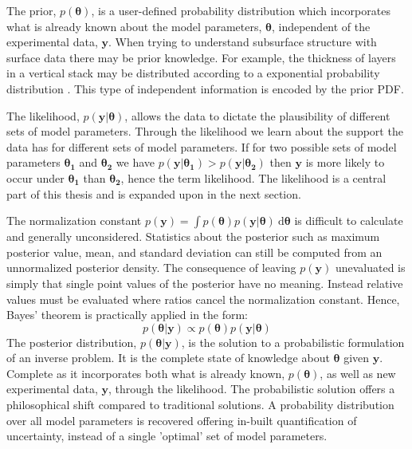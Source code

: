 The prior, $p(\bm{\theta})$, is a user-defined probability distribution which incorporates what is already known about the model parameters, $\bm{\theta}$, independent of the experimental data, $\bm{y}$. When trying to understand subsurface structure with surface data there may be prior knowledge. For example, the thickness of layers in a vertical stack may be distributed according to a exponential probability distribution \citep{Mosegaard1995}. This type of independent information is encoded by the prior PDF.\par

The likelihood, $p(\bm{y}|\bm{\theta})$, allows the data to dictate the plausibility of different sets of model parameters. Through the likelihood we learn about the support the data has for different sets of model parameters. If for two possible sets of model parameters $\bm{\theta_1}$ and $\bm{\theta_2}$ we have $p(\bm{y}|\bm{\theta_1}) > p(\bm{y}|\bm{\theta_2})$ then $\bm{y}$ is more likely to occur under $\bm{\theta_1}$ than $\bm{\theta_2}$, hence the term likelihood. The likelihood is a central part of this thesis and is expanded upon in the next section.\par

The normalization constant $p(\bm{y}) = \int p(\bm{\theta}) p(\bm{y}|\bm{\theta})\ \text{d}\bm{\theta}$ is difficult to calculate and generally unconsidered. Statistics about the posterior such as maximum posterior value, mean, and standard deviation can still be computed from an unnormalized posterior density. The consequence of leaving $p(\bm{y})$ unevaluated is simply that single point values of the posterior have no meaning. Instead relative values must be evaluated where ratios cancel the normalization constant. Hence, Bayes' theorem is practically applied in the form:
\begin{equation}
p(\bm{\theta}|\bm{y}) \propto p(\bm{\theta}) p(\bm{y}|\bm{\theta})
\label{applied_bayes}	
\end{equation}
The posterior distribution, $p(\bm{\theta}|\bm{y})$, is the solution to a probabilistic formulation of an inverse problem. It is the complete state of knowledge about $\bm{\theta}$ given $\bm{y}$. Complete as it incorporates both what is already known, $p(\bm{\theta})$, as well as new experimental data, $\bm{y}$, through the likelihood. The probabilistic solution offers a philosophical shift compared to traditional solutions. A probability distribution over all model parameters is recovered offering in-built quantification of uncertainty, instead of a single 'optimal' set of model parameters. \par

